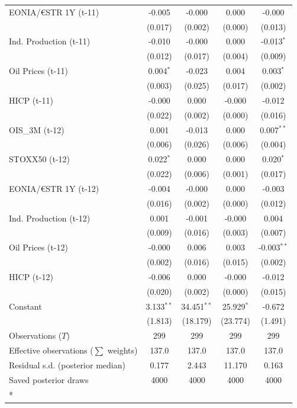 \begin{longtable}[t]{lcccc}
EONIA/€STR 1Y (t-11) & -0.005 & -0.000 & 0.000 & -0.000\\
 & (0.017) & (0.002) & (0.000) & (0.013)\\
Ind. Production (t-11) & -0.010 & -0.000 & 0.000 & -0.013$^{*}$\\
 & (0.012) & (0.017) & (0.004) & (0.009)\\
Oil Prices (t-11) & 0.004$^{*}$ & -0.023 & 0.004 & 0.003$^{*}$\\
 & (0.003) & (0.025) & (0.017) & (0.002)\\
HICP (t-11) & -0.000 & 0.000 & -0.000 & -0.012\\
 & (0.022) & (0.002) & (0.000) & (0.016)\\
OIS\_3M (t-12) & 0.001 & -0.013 & 0.000 & 0.007$^{**}$\\
 & (0.006) & (0.026) & (0.006) & (0.004)\\
STOXX50 (t-12) & 0.022$^{*}$ & 0.000 & 0.000 & 0.020$^{*}$\\
 & (0.022) & (0.006) & (0.001) & (0.017)\\
EONIA/€STR 1Y (t-12) & -0.004 & -0.000 & 0.000 & -0.003\\
 & (0.016) & (0.002) & (0.000) & (0.012)\\
Ind. Production (t-12) & 0.001 & -0.001 & -0.000 & 0.004\\
 & (0.009) & (0.016) & (0.003) & (0.007)\\
Oil Prices (t-12) & -0.000 & 0.006 & 0.003 & -0.003$^{**}$\\
 & (0.002) & (0.016) & (0.015) & (0.002)\\
HICP (t-12) & -0.006 & 0.000 & -0.000 & -0.012\\
 & (0.020) & (0.002) & (0.000) & (0.015)\\
Constant & 3.133$^{**}$ & 34.451$^{**}$ & 25.929$^{*}$ & -0.672\\
 & (1.813) & (18.179) & (23.774) & (1.491)\\
\midrule
Observations ($T$) & 299 & 299 & 299 & 299\\
Effective observations ($\sum$ weights) & 137.0 & 137.0 & 137.0 & 137.0\\
Residual s.d. (posterior median) & 0.177 & 2.443 & 11.170 & 0.163\\
Saved posterior draws & 4000 & 4000 & 4000 & 4000\\*
\end{longtable}
\endgroup{}

\begingroup\fontsize{7}{9}\selectfont

